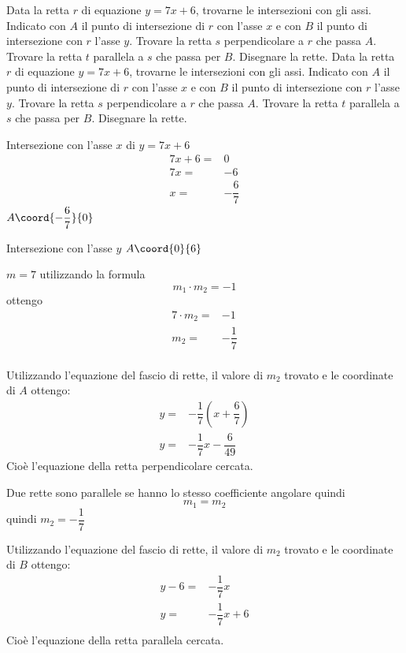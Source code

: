 \begin{exercise}
Data la retta $r$ di equazione $y=7x+6$, trovarne le intersezioni con gli assi. Indicato con $A$ il punto di intersezione di $r$ con l'asse $x$ e con $B$ il punto di intersezione con $r$ l'asse $y$. Trovare la retta $s$ perpendicolare a $r$ che passa $A$.
Trovare la retta $t$ parallela a $s$ che passa per $B$. Disegnare la rette.
\tcblower
Data la retta $r$ di equazione $y=7x+6$, trovarne le intersezioni con gli assi. Indicato con $A$ il punto di intersezione di $r$ con l'asse $x$ e con $B$ il punto di intersezione con $r$ l'asse $y$. Trovare la retta $s$ perpendicolare a $r$ che passa $A$.
Trovare la retta $t$ parallela a $s$ che passa per $B$. Disegnare la rette.
	
Intersezione con l'asse $x$ di $y=7x+6$
\begin{align*}
7x+6=&0\\
7x=&-6\\
x=&-\dfrac{6}{7}
\end{align*}
 $A\coord{-\dfrac{6}{7}}{0}$
 
 Intersezione con l'asse $y$
  $A\coord{0}{6}$
 
 	$m=7$ utilizzando la formula \[m_1\cdot m_2=-1\] ottengo
 	\begin{align*}
 	7\cdot m_2=&-1\\
 	m_2=&-\dfrac{1}{7}\\
 \end{align*}
 
 	Utilizzando l'equazione del fascio di rette, il valore di $m_2$ trovato e le coordinate di $A$ ottengo:
 	\begin{align*}
 	y=&-\dfrac{1}{7}(x+\dfrac{6}{7})\\
 	y=&-\dfrac{1}{7}x-\dfrac{6}{49}
 	\end{align*}
 	Cioè l'equazione della retta perpendicolare cercata.
 	
	Due rette sono parallele se hanno lo stesso coefficiente angolare quindi \[m_1=m_2 \]
	quindi $m_2=-\dfrac{1}{7}$ 
	
	Utilizzando l'equazione del fascio di rette, il valore di $m_2$ trovato e le coordinate di $B$ ottengo:
	\begin{align*}
	y-6=&-\dfrac{1}{7}x\\
	y=&-\dfrac{1}{7}x+6\\
	\end{align*}
	Cioè l'equazione della retta parallela cercata.	
		\begin{center}
			
		\end{center} 	
\end{exercise}
